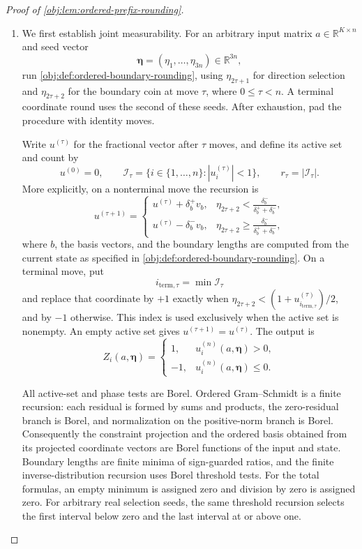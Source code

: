 \documentclass[11pt]{article}
\begin{document}
\begin{proof}[Proof of \cref{obj:lem:ordered-prefix-rounding}]
\begin{enumerate}
\item
We first establish joint measurability. For an arbitrary input matrix \(a\in\mathbb R^{K\times n}\) and seed vector
\[
\boldsymbol\eta=(\eta_1,\ldots,\eta_{3n})\in\mathbb R^{3n},
\]
run \cref{obj:def:ordered-boundary-rounding}, using \(\eta_{2\tau+1}\) for direction selection and \(\eta_{2\tau+2}\) for the boundary coin at move \(\tau\), where \(0\leq\tau<n\). A terminal coordinate round uses the second of these seeds. After exhaustion, pad the procedure with identity moves.

Write \(u^{(\tau)}\) for the fractional vector after \(\tau\) moves, and define its active set and count by
\[
u^{(0)}=0,\qquad
\mathcal I_\tau=\{i\in\{1,\ldots,n\}:|u_i^{(\tau)}|<1\},
\qquad
r_\tau=|\mathcal I_\tau|.
\]
More explicitly, on a nonterminal move the recursion is
\[
u^{(\tau+1)}
=
\begin{cases}
u^{(\tau)}+\delta_b^+v_b,
&\displaystyle \eta_{2\tau+2}<\frac{\delta_b^-}{\delta_b^++\delta_b^-},\\[4pt]
u^{(\tau)}-\delta_b^-v_b,
&\displaystyle \eta_{2\tau+2}\geq\frac{\delta_b^-}{\delta_b^++\delta_b^-},
\end{cases}
\]
where \(b\), the basis vectors, and the boundary lengths are computed from the current state as specified in \cref{obj:def:ordered-boundary-rounding}. On a terminal move, put
\[
i_{\mathrm{term},\tau}=\min\mathcal I_\tau
\]
and replace that coordinate by \(+1\) exactly when
\(\eta_{2\tau+2}<(1+u_{i_{\mathrm{term},\tau}}^{(\tau)})/2\), and by \(-1\) otherwise. This index is used exclusively when the active set is nonempty. An empty active set gives \(u^{(\tau+1)}=u^{(\tau)}\). The output is
\[
Z_i(a,\boldsymbol\eta)
=
\begin{cases}
1,&u_i^{(n)}(a,\boldsymbol\eta)>0,\\
-1,&u_i^{(n)}(a,\boldsymbol\eta)\leq0.
\end{cases}
\]

All active-set and phase tests are Borel. Ordered Gram--Schmidt is a finite recursion: each residual is formed by sums and products, the zero-residual branch is Borel, and normalization on the positive-norm branch is Borel. Consequently the constraint projection and the ordered basis obtained from its projected coordinate vectors are Borel functions of the input and state. Boundary lengths are finite minima of sign-guarded ratios, and the finite inverse-distribution recursion uses Borel threshold tests. For the total formulas, an empty minimum is assigned zero and division by zero is assigned zero. For arbitrary real selection seeds, the same threshold recursion selects the first interval below zero and the last interval at or above one.


\end{enumerate}
\end{proof}
\end{document}

